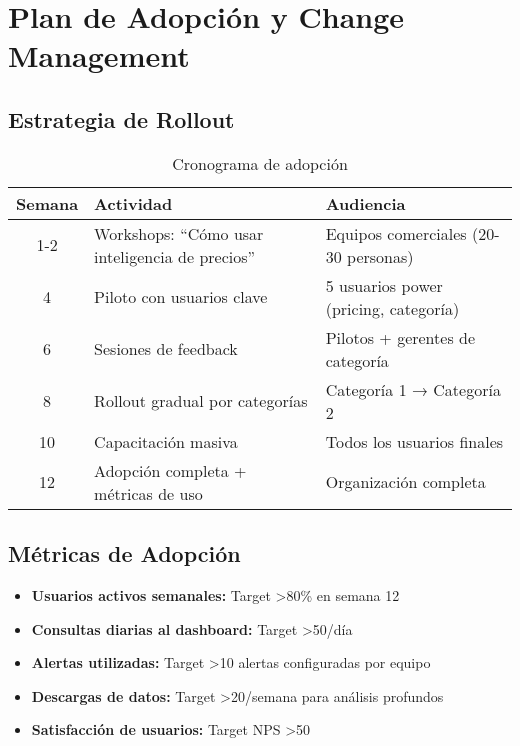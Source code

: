 \documentclass[12pt,a4paper]{article}
\begin{document}
\newpage
\section{Plan de Adopción y Change Management}

\subsection{Estrategia de Rollout}

\begin{table}[h]
\centering
\begin{tabularx}{\textwidth}{|c|X|X|}
\hline
\rowcolor{lightgray}
\textbf{Semana} & \textbf{Actividad} & \textbf{Audiencia} \\
\hline
1-2 & Workshops: ``Cómo usar inteligencia de precios'' & Equipos comerciales (20-30 personas) \\
\hline
4 & Piloto con usuarios clave & 5 usuarios power (pricing, categoría) \\
\hline
6 & Sesiones de feedback & Pilotos + gerentes de categoría \\
\hline
8 & Rollout gradual por categorías & Categoría 1 → Categoría 2 \\
\hline
10 & Capacitación masiva & Todos los usuarios finales \\
\hline
12 & Adopción completa + métricas de uso & Organización completa \\
\hline
\end{tabularx}
\caption{Cronograma de adopción}
\end{table}

\subsection{Métricas de Adopción}

\begin{itemize}[leftmargin=*]
    \item \textbf{Usuarios activos semanales:} Target >80\% en semana 12
    \item \textbf{Consultas diarias al dashboard:} Target >50/día
    \item \textbf{Alertas utilizadas:} Target >10 alertas configuradas por equipo
    \item \textbf{Descargas de datos:} Target >20/semana para análisis profundos
    \item \textbf{Satisfacción de usuarios:} Target NPS >50
\end{itemize}
\end{document}
